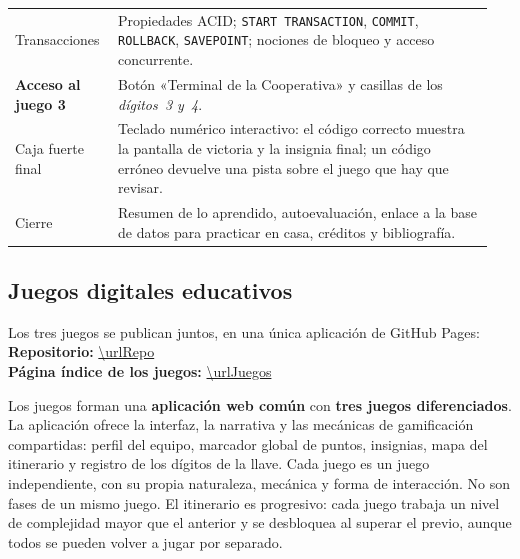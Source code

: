 \documentclass[11pt,a4paper]{article}
\begin{document}
\begin{longtable}{@{}p{0.2\linewidth}p{0.75\linewidth}@{}}
\addlinespace
Transacciones & Propiedades ACID; \texttt{START TRANSACTION}, \texttt{COMMIT},
\texttt{ROLLBACK}, \texttt{SAVEPOINT}; nociones de bloqueo y acceso concurrente. \\
\addlinespace
\textbf{Acceso al juego 3} & Botón «Terminal de la Cooperativa» y casillas de los
\emph{dígitos~3 y~4}. \\
\addlinespace
Caja fuerte final & Teclado numérico interactivo: el código correcto muestra la pantalla
de victoria y la insignia final; un código erróneo devuelve una pista sobre el juego que hay
que revisar. \\
\addlinespace
Cierre & Resumen de lo aprendido, autoevaluación, enlace a la base de datos para
practicar en casa, créditos y bibliografía. \\
\bottomrule
\end{longtable}

\subsection{Juegos digitales educativos}

\begin{nota}
Los tres juegos se publican juntos, en una única aplicación de GitHub Pages:\\
\textbf{Repositorio:} \url{\urlRepo}\\
\textbf{Página índice de los juegos:} \url{\urlJuegos}
\end{nota}

Los juegos forman una \textbf{aplicación web común} con \textbf{tres juegos diferenciados}.
La aplicación ofrece la interfaz, la narrativa y las mecánicas de gamificación
compartidas: perfil del equipo, marcador global de puntos, insignias, mapa del itinerario y
registro de los dígitos de la llave. Cada juego es un juego independiente, con su propia
naturaleza, mecánica y forma de interacción. No son fases de un mismo juego. El
itinerario es progresivo: cada juego trabaja un nivel de complejidad mayor que el anterior
y se desbloquea al superar el previo, aunque todos se pueden volver a jugar por separado.
\end{document}
